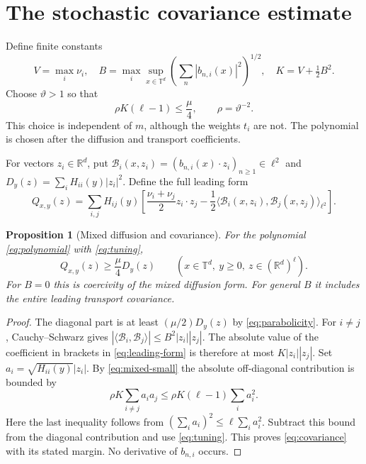 \documentclass[11pt]{amsart}
\newtheorem{proposition}[theorem]{Proposition}
\theoremstyle{definition}
\newcommand{\T}{\mathbb T}
\newcommand{\R}{\mathbb R}
\newcommand{\ellTwo}{\ell^2}
\numberwithin{equation}{section}
\begin{document}
\section{The stochastic covariance estimate}\label{sec:covariance}

Define finite constants
\begin{equation}\label{eq:constants}
V=\max_i\nu_i,\quad
B=\max_i\sup_{x\in\T^d}
 \left(\sum_n|b_{n,i}(x)|^2\right)^{1/2},\quad
K=V+\tfrac12B^2.
\end{equation}
Choose $\vartheta>1$ so that
\begin{equation}\label{eq:tuning}
\rho K(\ell-1)\leq\frac\mu4,\qquad \rho=\vartheta^{-2}.
\end{equation}
This choice is independent of $m$, although the weights $t_i$ are not.
The polynomial is chosen after the diffusion and transport coefficients.

For vectors $z_i\in\R^d$, put
$\mathcal B_i(x,z_i)=(b_{n,i}(x)\cdot z_i)_{n\geq1}\in\ellTwo$ and
$D_y(z)=\sum_iH_{ii}(y)|z_i|^2$. Define the full leading form
\begin{equation}\label{eq:leading-form}
Q_{x,y}(z)=\sum_{i,j}H_{ij}(y)
 \left[\frac{\nu_i+\nu_j}{2}z_i\cdot z_j
 -\frac12\langle\mathcal B_i(x,z_i),\mathcal B_j(x,z_j)\rangle_{\ellTwo}
 \right].
\end{equation}

\begin{proposition}[Mixed diffusion and covariance]\label{prop:covariance}
For the polynomial \eqref{eq:polynomial} with \eqref{eq:tuning},
\begin{equation}\label{eq:covariance}
Q_{x,y}(z)\geq\frac\mu4D_y(z)
 \qquad(x\in\T^d,\ y\geq0,\ z\in(\R^d)^\ell).
\end{equation}
For $B=0$ this is coercivity of the mixed diffusion form. For general
$B$ it includes the entire leading transport covariance.
\end{proposition}
\begin{proof}
The diagonal part is at least $(\mu/2)D_y(z)$ by
\eqref{eq:parabolicity}. For $i\ne j$, Cauchy--Schwarz gives
$|\langle\mathcal B_i,\mathcal B_j\rangle|\leq B^2|z_i||z_j|$.
The absolute value of the coefficient in brackets in
\eqref{eq:leading-form} is therefore at most $K|z_i||z_j|$.
Set $a_i=\sqrt{H_{ii}(y)}|z_i|$. By \eqref{eq:mixed-small} the absolute
off-diagonal contribution is bounded by
\[
\rho K\sum_{i\ne j}a_i a_j
 \leq\rho K(\ell-1)\sum_i a_i^2.
\]
Here the last inequality follows from
$(\sum_i a_i)^2\leq\ell\sum_i a_i^2$.
Subtract this bound from the diagonal contribution and use
\eqref{eq:tuning}. This proves \eqref{eq:covariance} with its stated
margin. No derivative of $b_{n,i}$ occurs.
\end{proof}
\end{document}
